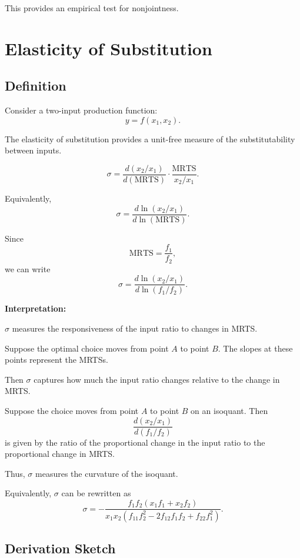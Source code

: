 This provides an empirical test for nonjointness.

\section{Elasticity of Substitution}

\subsection{Definition}

Consider a two-input production function:
\[
y = f(x_1, x_2).
\]

The elasticity of substitution provides a unit-free measure of the
substitutability between inputs.

\[
\sigma
=
\frac{d(x_2/x_1)}{d(\text{MRTS})}
\cdot
\frac{\text{MRTS}}{x_2/x_1}.
\]

Equivalently,
\[
\sigma
=
\frac{d \ln(x_2/x_1)}{d \ln(\text{MRTS})}.
\]

Since
\[
\text{MRTS}
=
\frac{f_1}{f_2},
\]
we can write
\[
\sigma
=
\frac{d \ln(x_2/x_1)}{d \ln(f_1/f_2)}.
\]

\medskip

\textbf{Interpretation:}

$\sigma$ measures the responsiveness of the input ratio to changes in MRTS.

\medskip

Suppose the optimal choice moves from point $A$ to point $B$.
The slopes at these points represent the MRTSs.

Then $\sigma$ captures how much the input ratio changes relative to
the change in MRTS.




Suppose the choice moves from point $A$ to point $B$ on an isoquant.
Then
\[
\frac{d(x_2/x_1)}{d(f_1/f_2)}
\]
is given by the ratio of the proportional change in the input ratio
to the proportional change in MRTS.

Thus, $\sigma$ measures the curvature of the isoquant.

\medskip

Equivalently, $\sigma$ can be rewritten as
\[
\sigma
=
-\frac{f_1 f_2 (x_1 f_1 + x_2 f_2)}
{x_1 x_2 \left( f_{11} f_2^2 - 2 f_{12} f_1 f_2 + f_{22} f_1^2 \right)}.
\]

\subsection*{Derivation Sketch}

